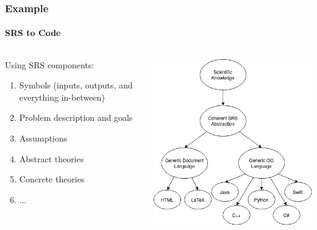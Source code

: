 \documentclass[xcolor={dvipsnames}]{beamer}
\begin{document}
\begin{frame}
  \frametitle{Example}
  \framesubtitle{SRS to Code}

  \begin{columns}
    \begin{column}{0.45\textwidth}
      Using SRS components:
      \begin{enumerate}
        \item Symbols (inputs, outputs, and everything in-between)
        \item Problem description and goals
        \item Assumptions
        \item Abstract theories
        \item Concrete theories
        \item \(\ldots{}\)
      \end{enumerate}
    \end{column}
    \hfill
    \begin{column}{0.5\textwidth}
      \includegraphics[width=\textwidth]{roughNetworkOfDomains.png}
    \end{column}
  \end{columns}

\end{frame}
\end{document}
